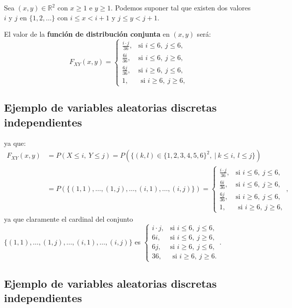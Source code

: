 \documentclass[]{book}
\begin{document}
Sea \((x,y)\in \mathbb{R}^2\) con \(x\geq 1\) e \(y\geq 1\). Podemos suponer tal que existen dos valores \(i\) y \(j\) en \(\{1,2,\ldots\}\) con \(i\leq x < i+1\) y \(j\leq y <j+1\).

El valor de la \textbf{función de distribución conjunta} en \((x,y)\) será:
\[
F_{XY}(x,y)=\begin{cases}
\frac{i\cdot j}{36}, & \mbox{si }i\leq 6, \ j\leq 6, \\
\frac{6 i}{36}, & \mbox{si }i\leq 6,\ j\geq 6,\\
\frac{6 j}{36}, & \mbox{si }i\geq 6,\ j\leq 6,\\
1, & \mbox{ si }i\geq 6,\ j\geq 6,
\end{cases}
\]

\hypertarget{ejemplo-de-variables-aleatorias-discretas-independientes-2}{%
\subsection{Ejemplo de variables aleatorias discretas independientes}\label{ejemplo-de-variables-aleatorias-discretas-independientes-2}}

ya que:
\[
\begin{array}{rl}
F_{XY}(x,y) & =P(X\leq i,\ Y\leq j)=P(\{(k,l)\in \{1,2,3,4,5,6\}^2,\ |\ k\leq i,\ l\leq j\})\\ & =P(\{(1,1),\ldots,(1,j),\ldots,(i,1),\ldots,(i,j)\})=\begin{cases}
\frac{i\cdot j}{36}, & \mbox{si }i\leq 6, \ j\leq 6, \\
\frac{6 i}{36}, & \mbox{si }i\leq 6,\ j\geq 6,\\
\frac{6 j}{36}, & \mbox{si }i\geq 6,\ j\leq 6,\\
1, & \mbox{ si }i\geq 6,\ j\geq 6,
\end{cases},
\end{array}
\]
ya que claramente el cardinal del conjunto \(\{(1,1),\ldots,(1,j),\ldots,(i,1),\ldots,(i,j)\}\) es \(\begin{cases} i\cdot j, & \mbox{si }i\leq 6, \ j\leq 6, \\ 6 i, & \mbox{si }i\leq 6,\ j\geq 6,\\ 6 j, & \mbox{si }i\geq 6,\ j\leq 6,\\ 36, & \mbox{ si }i\geq 6,\ j\geq 6. \end{cases}\).

\hypertarget{ejemplo-de-variables-aleatorias-discretas-independientes-3}{%
\subsection{Ejemplo de variables aleatorias discretas independientes}\label{ejemplo-de-variables-aleatorias-discretas-independientes-3}}
\end{document}
